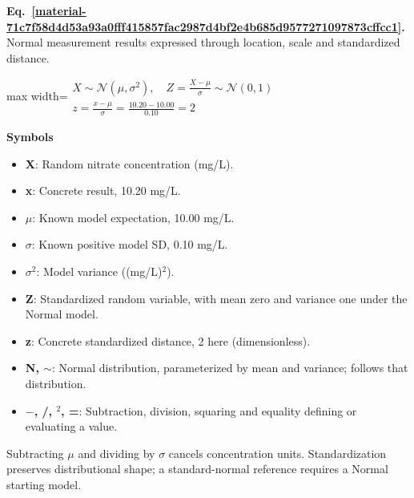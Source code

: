 \documentclass[11pt,a4paper]{article}
\begin{document}
\par\medskip
\noindent\begin{minipage}{\linewidth}
\label{material-71c7f58d4d53a93a0fff415857fac2987d4bf2e4b685d9577271097873cffcc1}
\noindent\textbf{Eq.~\ref*{material-71c7f58d4d53a93a0fff415857fac2987d4bf2e4b685d9577271097873cffcc1}.} Normal measurement results expressed through location, scale and standardized distance.\par\nopagebreak
\begin{center}\begin{adjustbox}{max width=\linewidth}$\displaystyle \begin{gathered}X\sim\mathcal N(\mu,\sigma^2),\quad Z=\frac{X-\mu}{\sigma}\sim\mathcal N(0,1)\\z=\frac{x-\mu}{\sigma}=\frac{10.20-10.00}{0.10}=2\end{gathered}$\end{adjustbox}\end{center}

\par\noindent\textbf{Symbols}

\begin{itemize}\setlength{\itemsep}{1pt}\setlength{\parsep}{0pt}
\item \textbf{X}: Random nitrate concentration (mg/L).
\item \textbf{x}: Concrete result, 10.20 mg/L.
\item \textbf{\ensuremath{\mu}}: Known model expectation, 10.00 mg/L.
\item \textbf{\ensuremath{\sigma}}: Known positive model SD, 0.10 mg/L.
\item \textbf{\ensuremath{\sigma}\ensuremath{{}^2}}: Model variance ((mg/L)\ensuremath{{}^2}).
\item \textbf{Z}: Standardized random variable, with mean zero and variance one under the Normal model.
\item \textbf{z}: Concrete standardized distance, 2 here (dimensionless).
\item \textbf{N, \ensuremath{\sim}}: Normal distribution, parameterized by mean and variance; follows that distribution.
\item \textbf{\ensuremath{-}, /, \ensuremath{{}^2}, =}: Subtraction, division, squaring and equality defining or evaluating a value.
\end{itemize}

Subtracting \ensuremath{\mu} and dividing by \ensuremath{\sigma} cancels concentration units. Standardization preserves distributional shape; a standard-normal reference requires a Normal starting model.

\end{minipage}\par
\medskip
\end{document}
